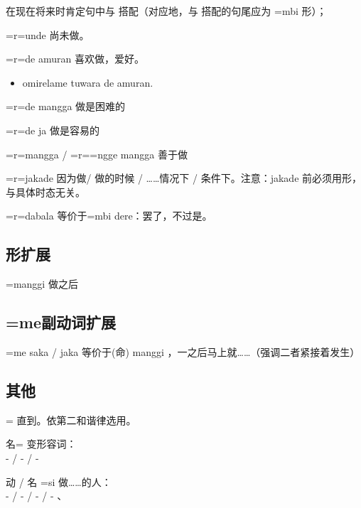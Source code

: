 在现在将来时肯定句中与  搭配（对应地，与  搭配的句尾应为 =mbi 形）；

\begin{des}
    \item[\V=r=\AIfina unde] 尚未做。
    \item[\V=r=\AIfina de amuran] 喜欢做\V ，爱好。
    \begin{itemize}
        \item {}  omirelame  tuwara de amuran.
    \end{itemize} 
    \item[\V=r=\AIfina de mangga] 做\V 是困难的
    \item[\V=r=\AIfina de ja]做\V 是容易的
    \item[\V=r=\AIfina mangga / \V=r=\AImedi=ngge mangga] 善于做\V  
    \item[\V=r=\AIfina jakade] 因为做\V / 做\V 的时候 / ……情况下 / 条件下。注意：jakade 前必须用形，与具体时态无关。
    \item[\V=r=\AIfina dabala] 等价于\V=mbi dere：罢了，不过是。 
\end{des}

\subsection{形扩展}

\begin{des}
    \item[\V=\HA manggi] 做\V 之后
\end{des}

\subsection{=me副动词扩展}

\begin{des}
    \item[\V=me saka / jaka] 等价于\V (命) manggi ，一\V 之后马上就……（强调二者紧接着发生）
\end{des}

\subsection{其他}

\begin{des}
    \item[\V=\ii{=ta}{=te}{=to}] 直到。依第二和谐律选用。
    \item[名=\ii{=ngga}{=ngge}{=nggo}] 变形容词：\\
         -  / 
         -  / 
         - 
    \item[动 / 名 =si] 做……的人：\\
         -  /
         -  /
         -  /
         - 、
\end{des}

